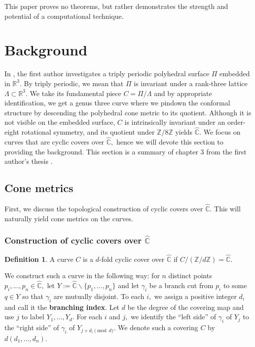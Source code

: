 \documentclass[12pt,reqno]{amsart}
\newcommand{\C}{\mathbb{C}}
\newcommand{\Z}{\mathbb{Z}}
\newcommand{\R}{\mathbb{R}}
\theoremstyle{definition}
\newtheorem{defn}{Definition}
\theoremstyle{remark}
\begin{document}
This paper proves no theorems, but rather demonstrates the strength and potential of a computational technique.

\section{Background}
\label{sec: dthesis}
In \cite{dami}, the first author investigates a triply periodic polyhedral surface $\Pi$ embedded in $\mathbb{R}^3.$ By triply periodic, we mean that $\Pi$ is invariant under a rank-three lattice $\Lambda \subset \R^3.$ We take its fundamental piece $C = \Pi / \Lambda$ and by appropriate identification, we get a genus three curve where we pindown the conformal structure by descending the polyhedral cone metric to its quotient. Although it is not visible on the embedded surface, $C$ is intrinsically invariant under an order-eight rotational symmetry, and its quotient under $\Z/ 8 \Z$ yields $\widehat{\C}.$ We focus on curves that are cyclic covers over $\widehat{\C},$ hence we will devote this section to providing the background. This section is a summary of chapter 3 from the first author's thesis \cite{dthesis}. 

\subsection{Cone metrics}
First, we discuss the topological construction of cyclic covers over $\widehat{\C}.$ This will naturally yield cone metrics on the curves.

\subsubsection*{Construction of cyclic covers over $\widehat{\C}$}
\begin{defn} A curve $C$ is a $d$-fold cyclic cover over $\widehat{\C}$ if $C / (\Z/ d \Z) = \widehat{\C}.$ \end{defn}

We construct such a curve in the following way: for $n$ distinct points $p_i, \ldots , p_n \in \widehat{\C},$ let $Y := \widehat{\C} \backslash \{p_1, \ldots, p_n\}$ and let $\gamma_i$ be a branch cut from $p_i$ to some $q \in Y$ so that $\gamma_i$ are mutually disjoint. To each $i,$ we assign a positive integer $d_i$ and call it the \textbf{branching index}. Let $d$ be the degree of the covering map and use $j$ to label $Y_1, \ldots , Y_d.$ For each $i$ and $j,$ we identify the ``left side'' of $\gamma_i$ of $Y_j$ to the ``right side'' of $\gamma_i$ of $Y_{j + d_i \pmod d}.$ We denote such a covering $C$ by $d (d_1, \ldots , d_n).$
\end{document}
